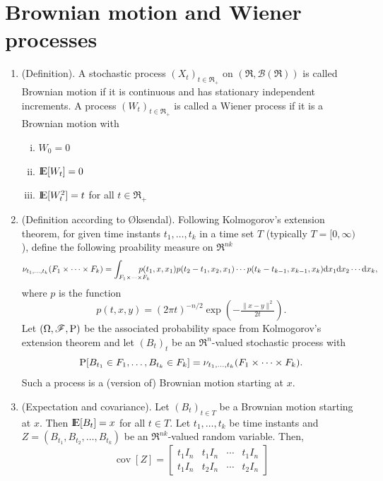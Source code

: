 \documentclass[a4paper,10pt]{scrbook}
\begin{document}
\section{Brownian motion and Wiener processes}
\begin{enumerate}
 \item (Definition). A stochastic process \((X_t)_{t\in \Re_+}\) on \((\Re, \mathcal{B}(\Re))\) is 
 called Brownian motion if it is continuous and has stationary independent increments. A process 
 \((W_t)_{t\in\Re_+}\) is called a Wiener process if it is a Brownian motion with 
 \begin{enumerate}[i.]
  \item \(W_0 = 0\)
  \item \(\E[W_t] = 0\)
  \item \(\E[W_t^2] = t\) for all \(t\in\Re_+\)
 \end{enumerate}
  \item (Definition according to \O{}ksendal). Following Kolmogorov's extension theorem,
        for given time instants \(t_1, \ldots, t_k\) in a time set \(T\) (typically \(T=[0, \infty)\)),
        define the following proability measure on \(\Re^{nk}\)
        \[
         \nu_{t_1,\ldots, t_k}(F_1\times \cdots \times F_k)
         =
         \int_{F_1\times\cdots\times F_k}\hspace{-1.6em} p(t_1, x, x_1) p(t_2-t_1, x_2, x_1) \cdots p(t_k - t_{k-1}, x_{k-1}, x_{k})
         \mathrm{d} x_1 \mathrm{d} x_2 \cdots \mathrm{d} x_k,
        \]
	where \(p\) is the function
	\[
	 p(t, x, y) {}={} (2\pi t)^{-n/2}\exp\left(-\tfrac{\|x-y\|^2}{2t}\right).
	\]
	Let \((\Omega,\mathscr{F},\mathrm{P})\) be the associated probability space from Kolmogorov's extension theorem 
	and let \((B_t)_t\) be an \(\Re^{n}\)-valued stochastic process with 
	\[
	 \mathrm{P}[B_{t_1} \in F_1, \ldots, B_{t_k} \in F_k] = \nu_{t_1,\ldots, t_k}(F_1\times \cdots \times F_k).
	\]
	Such a process is a (version of) Brownian motion starting at \(x\).
 \item (Expectation and covariance). Let \((B_t)_{t\in T}\) be a Brownian motion starting at \(x\).
        Then \(\E[B_t] = x\) for all \(t\in T\). Let \(t_1, \ldots, t_k\) be time instants and 
        \(Z = (B_{t_1}, B_{t_2}, \ldots, B_{t_k})\) be an \(\Re^{nk}\)-valued random variable.
        Then,
        \[
        \operatorname{cov}[Z] = \begin{bmatrix}
                                 t_1 I_n & t_1 I_n & \cdots & t_1 I_n 
                                 \\
                                 t_1 I_n & t_2 I_n & \cdots & t_2 I_n

\end{bmatrix}\]
\end{enumerate}
\end{document}
